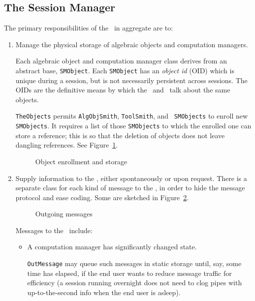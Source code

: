 \subsection{The Session Manager}

The primary responsibilities of the \SM\ in aggregate are to:

\begin{enumerate}

\item
Manage the physical storage of algebraic objects and computation
managers.

Each algebraic object and computation manager class derives from an
abstract base, {\tt SMObject}. Each {\tt SMObject} has an {\em object
id} (OID) which is unique during a session, but is not necessarily
persistent across sessions. The OIDs are the definitive means by which
the \FE\ and \SM\ talk about the same objects.

{\tt TheObjects} permits {\tt AlgObjSmith}, {\tt ToolSmith}, and {\tt
SMObjects} to enroll new {\tt SMObjects}. It requires a list of those
{\tt SMObjects} to which the enrolled one can store a reference; this
is so that the deletion of objects does not leave dangling references.
See Figure~\ref{sm1}.

\begin{figure}[htbp]
\caption{Object enrollment and storage}\label{sm1}
\end{figure}

\item
Supply information to the \FE, either spontaneously or upon request.
There is a separate class for each kind of message to the \FE, in
order to hide the message protocol and ease coding. Some are sketched
in Figure~\ref{sm3}.

\begin{figure}[htbp]
\caption{Outgoing messages}\label{sm3}
\end{figure}

Messages to the \FE\ include:

\begin{itemize}

\item
A computation manager has significantly changed state.

{\tt OutMessage} may queue such messages in static storage until, say,
some time has elapsed, if the end user wants to reduce message traffic
for efficiency (a session running overnight does not need to clog
pipes with up-to-the-second info when the end user is asleep).


\end{itemize}
\end{enumerate}
